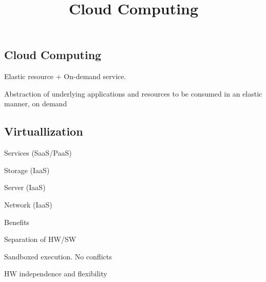 \documentclass[12pt]{article}
\title{\textbf{Cloud Computing}}
\date{}
\begin{document}
\maketitle

\begin{spacing}{1.5}

\section{Cloud Computing}

Elastic resource + On-demand service.

Abstraction of underlying applications and resources to be consumed in an elastic manner, on demand

\subsection{Virtuallization}

\begin{itemize*}
	\item Services (SaaS/PaaS)
	\item Storage (IaaS)
	\item Server (IaaS)
	\item Network (IaaS)
\end{itemize*}

Benefits

\begin{itemize*}
	\item Separation of HW/SW
	\item Sandboxed execution. No conflicts
	\item HW independence and flexibility
\end{itemize*}


\end{spacing}
\end{document}
